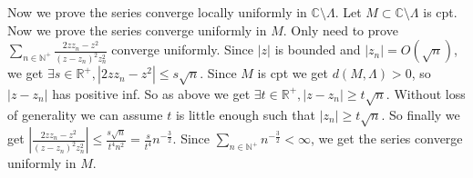 \documentclass{ctexart}
\begin{document}
\begin{solution}
	Now we prove the series converge locally uniformly in \(\mathbb{C}\setminus \Lambda\).
	Let \(M \subset\mathbb{C}\setminus \Lambda\) is cpt. Now we prove the series converge uniformly in \(M\).
	Only need to prove \(\sum_{n \in \mathbb{N}^+} \frac{2z z_n-z^2}{(z-z_n)^2 z_n^2}\) converge uniformly.
	Since \(|z|\) is bounded and \(|z_n|=O(\sqrt{n})\), we get \(\exists s \in \mathbb{R}^+,| 2z z_n-z^2| \leq s \sqrt{n}\).
	Since \(M\) is cpt we get \(d(M,\Lambda)>0\), so \(|z-z_n|\) has positive inf.
	So as above we get \(\exists t \in \mathbb{R}^+,|z-z_n| \geq t \sqrt{n}\).
	Without loss of generality we can assume \(t\) is little enough such that \(|z_n|\geq t \sqrt{n}\).
	So finally we get \(\left|\frac{2z z_n - z^2}{(z-z_n)^2 z_n^2}\right| \leq \frac{s \sqrt{n}}{t^4 n^2}=\frac{s}{t^4} n^{-\frac{3}{2}}\).
	Since \(\sum_{n \in \mathbb{N}^+} n^{-\frac{3}{2}}<\infty\), we get the series converge uniformly in \(M\).
\end{solution}
\end{document}
